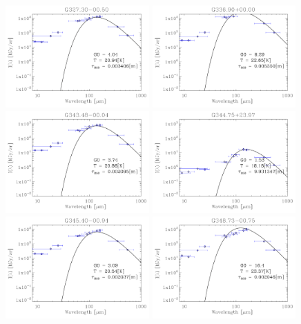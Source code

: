 \begin{figure}
\includegraphics[trim=-1mm -1mm -1mm -1mm, clip, width=55mm]{appB/appB_84.pdf}
\includegraphics[trim=-1mm -1mm -1mm -1mm, clip, width=55mm]{appB/appB_85.pdf}
\includegraphics[trim=-1mm -1mm -1mm -1mm, clip, width=55mm]{appB/appB_86.pdf}
\includegraphics[trim=-1mm -1mm -1mm -1mm, clip, width=55mm]{appB/appB_87.pdf}
\includegraphics[trim=-1mm -1mm -1mm -1mm, clip, width=55mm]{appB/appB_88.pdf}
\includegraphics[trim=-1mm -1mm -1mm -1mm, clip, width=55mm]{appB/appB_89.pdf}
\end{figure}



  